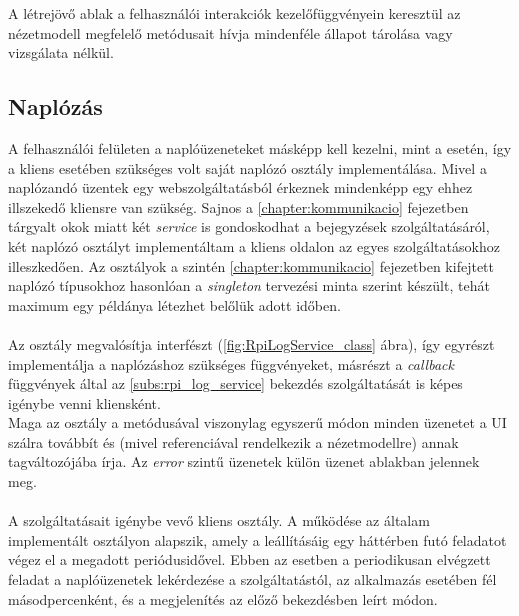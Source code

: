 A létrejövő ablak a felhasználói interakciók kezelőfüggvényein keresztül az nézetmodell megfelelő metódusait hívja mindenféle állapot tárolása vagy vizsgálata nélkül.

\subsection{Naplózás} \label{subs:client_log}

A felhasználói felületen a naplóüzeneteket másképp kell kezelni, mint a  esetén, így a kliens esetében szükséges volt saját naplózó osztály implementálása. Mivel a naplózandó üzentek egy webszolgáltatásból érkeznek mindenképp egy ehhez illszekedő kliensre van szükség. Sajnos a \ref{chapter:kommunikacio} fejezetben tárgyalt okok miatt két \emph{service} is gondoskodhat a bejegyzések szolgáltatásáról, két naplózó osztályt implementáltam a kliens oldalon az egyes szolgáltatásokhoz illeszkedően. Az osztályok a szintén \ref{chapter:kommunikacio} fejezetben kifejtett naplózó típusokhoz hasonlóan a \emph{singleton} tervezési minta szerint készült, tehát maximum egy példánya létezhet belőlük adott időben.

\paragraph{} Az osztály megvalósítja  interfészt (\ref{fig:RpiLogService_class} ábra), így egyrészt implementálja a naplózáshoz szükséges függvényeket, másrészt a \emph{callback} függvények által az \ref{subs:rpi_log_service} bekezdés  szolgáltatását is képes igénybe venni kliensként.\\
Maga az osztály a  metódusával viszonylag egyszerű módon minden üzenetet a UI szálra továbbít és (mivel referenciával rendelkezik a nézetmodellre) annak  tagváltozójába írja. Az \emph{error} szintű üzenetek külön üzenet ablakban jelennek meg.

\paragraph{} A  szolgáltatásait igénybe vevő kliens osztály. A működése az általam implementált  osztályon alapszik, amely a leállításáig egy háttérben futó feladatot végez el a megadott periódusidővel. Ebben az esetben a periodikusan elvégzett feladat a naplóüzenetek lekérdezése a szolgáltatástól, az alkalmazás esetében fél másodpercenként, és a megjelenítés az előző bekezdésben leírt módon.

